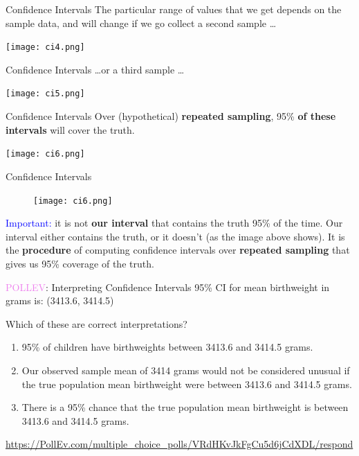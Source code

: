 \documentclass[10pt,t]{beamer}
\begin{document}
\begin{frame}{Confidence Intervals}
The particular range of values that we get depends on the sample data, and will change if we go collect a second sample \dots

\centering \texttt{[image: ci4.png]}

\end{frame}

\begin{frame}{Confidence Intervals}
\dots or a third sample \dots

\centering \texttt{[image: ci5.png]}

\end{frame}

\begin{frame}{Confidence Intervals}
Over (hypothetical) \textbf{repeated sampling}, 95\% \textbf{of these intervals} will cover the truth.

\centering \texttt{[image: ci6.png]}

\end{frame}

\begin{frame}{Confidence Intervals}

\begin{figure}
\centering \texttt{[image: ci6.png]}
\end{figure}


\textcolor{blue}{Important:} it is not \textbf{our interval} that contains the truth 95\% of the time. Our interval either contains the truth, or it doesn't (as the image above shows). It is the \textbf{procedure} of computing confidence intervals over \textbf{repeated sampling} that gives us 95\% coverage of the truth.

\end{frame}

\begin{frame}{\textcolor{violet}{POLLEV}: Interpreting Confidence Intervals}
95\% CI for mean birthweight in grams is: (3413.6, 3414.5)

\vspace{0.3cm}

Which of these are correct interpretations?

\vspace{0.3cm}

\begin{enumerate}
	\item 95\% of children have birthweights between 3413.6 and 3414.5 grams.
	\medskip
	\item Our observed sample mean of 3414 grams would not be considered unusual if the true population mean birthweight were between 3413.6 and 3414.5 grams.
	\medskip
	\item There is a 95\% chance that the true population mean birthweight is between 3413.6 and 3414.5 grams.
\end{enumerate}

\footnotesize
\url{https://PollEv.com/multiple_choice_polls/VRdHKvJkFgCu5d6jCdXDL/respond}
\end{frame}
\end{document}

